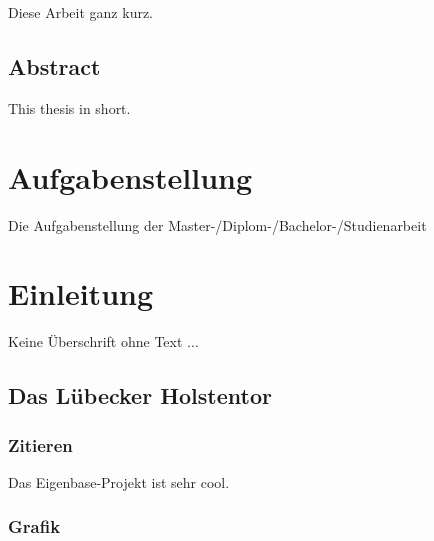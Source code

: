 \documentclass[
	ngerman,
	11pt,
	twoside,
	a4paper,
	headsepline,
	footsepline, 
	toc=bib
]{scrbook}
\begin{document}
Diese Arbeit ganz kurz.

%
\vskip 3cm
%

\section*{\huge Abstract}

This thesis in short.

\thispagestyle{empty}
\cleardoublepage


\chapter*{Aufgabenstellung}

Die Aufgabenstellung der Master-/Diplom-/Bachelor-/Studienarbeit


	\thispagestyle{empty}
	\cleardoublepage

	\mainmatter


\chapter{Einleitung}
\label{cha:einleitung}

Keine Überschrift ohne Text $\dots$

\section{Das Lübecker Holstentor}
\label{sec:holstentor}

\subsection{Zitieren}
\label{sec:cite}

Das Eigenbase-Projekt \cite{Akyildiz2008a} ist sehr cool.

\subsection{Grafik}
\end{document}
